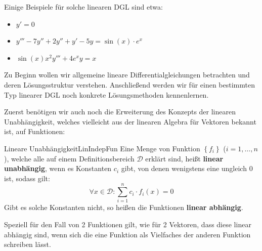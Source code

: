 Einige Beispiele für solche linearen DGL sind etwa:

\begin{itemize}
    \item $y'=0$
    \item $y'''-7y''+2y''+y'-5y=\sin(x)\cdot e^x$
    \item $\sin(x)x^2y'''+4e^x y = x$
\end{itemize}

Zu Beginn wollen wir allgemeine lineare Differentialgleichungen betrachten und deren Lösungsstruktur verstehen. Anschließend werden wir für einen bestimmten Typ linearer DGL noch konkrete Lösungsmethoden kennenlernen.

Zuerst benötigen wir auch noch die Erweiterung des Konzepts der linearen Unabhängigkeit, welches vielleicht aus der linearen Algebra für Vektoren bekannt ist, auf Funktionen:

\begin{definition}{Lineare Unabhängigkeit}{LinIndepFun}
    Eine Menge von Funktion $\left\lbrace f_i \right\rbrace$ ($i=1,\dots,n$), welche alle auf einem Definitionsbereich $\mathcal{D}$ erklärt sind, heißt \textbf{linear unabhängig}, wenn es Konstanten $c_i$ gibt, von denen wenigstens eine ungleich $0$ ist, sodass gilt:
    $$
        \forall x \in \mathcal{D}: \sum\limits_{i=1}^n c_i \cdot f_i(x) = 0
    $$
    Gibt es solche Konstanten nicht, so heißen die Funktionen \textbf{linear abhängig}.
\end{definition}

Speziell für den Fall von 2 Funktionen gilt, wie für 2 Vektoren, dass diese linear abhängig sind, wenn sich die eine Funktion als Vielfaches der anderen Funktion schreiben lässt.

